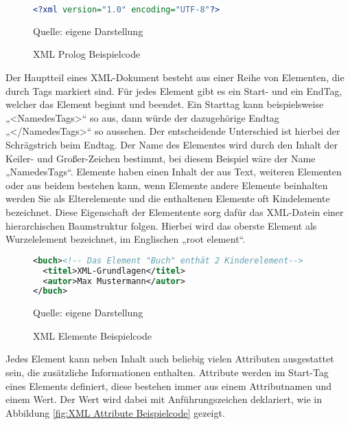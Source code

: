 \begin{figure}[H]
\centering
\begin{minipage}{0.95\textwidth}
\begin{lstlisting}[language=XML]
<?xml version="1.0" encoding="UTF-8"?>
\end{lstlisting}
\end{minipage}
\caption{XML Prolog Beispielcode}
\label{fig:XML Prolog Beispielcode}
    {Quelle: eigene Darstellung}
\end{figure}


Der Hauptteil eines \ac{XML}-Dokument besteht aus einer Reihe von Elementen, die durch Tags markiert sind.
Für jedes Element gibt es ein Start- und ein EndTag, welcher das Element beginnt und beendet.
Ein Starttag kann beispielsweise „<NamedesTags>“ so aus, dann würde der dazugehörige Endtag „</NamedesTags>“ so aussehen.
Der entscheidende Unterschied ist hierbei der Schrägstrich beim Endtag.
Der Name des Elementes wird durch den Inhalt der Keiler- und Großer-Zeichen bestimmt, bei diesem Beispiel wäre der Name „NamedesTags“.
Elemente haben einen Inhalt der aus Text, weiteren Elementen oder aus beidem bestehen kann,
wenn Elemente andere Elemente beinhalten werden Sie als Elterelemente und die enthaltenen Elemente oft Kindelemente bezeichnet.
Diese Eigenschaft der Elementente sorg dafür das XML-Datein einer hierarchischen Baumstruktur folgen.
Hierbei wird das oberste Element als Wurzelelement bezeichnet, im Englischen „root element“.\cite*[10-14]{Becher2022}


\begin{figure}[H]
\centering
\begin{minipage}{0.95\textwidth}
\begin{lstlisting}[language=XML]
<buch><!-- Das Element "Buch" enthät 2 Kinderelement-->
  <titel>XML-Grundlagen</titel>
  <autor>Max Mustermann</autor>
</buch>
\end{lstlisting}
\end{minipage}
\caption{XML Elemente Beispielcode}
\label{fig:XML Elemente Beispielcode}
    {Quelle: eigene Darstellung}
\end{figure}

Jedes Element kann neben Inhalt auch beliebig vielen Attributen ausgestattet sein, die zusätzliche Informationen enthalten.
Attribute werden im Start-Tag eines Elements definiert, diese bestehen immer aus einem Attributnamen und einem Wert.
Der Wert wird dabei mit Anführungszeichen deklariert, wie in Abbildung \ref{fig:XML Attribute Beispielcode} gezeigt. \cite*[10-14]{Becher2022}

